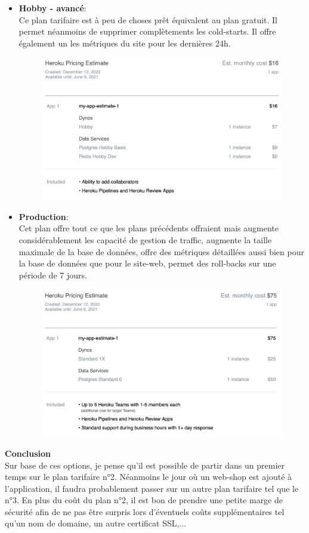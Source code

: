 \begin{itemize}
  \newpage
  \item \textbf{Hobby - avancé}: \\ Ce plan tarifaire est à peu de choses prêt équivalent au plan gratuit. Il permet néanmoins de supprimer complètements les cold-starts. Il offre également un les métriques du site pour les dernières 24h.
  \begin{figure}[H]
    \centering
    \includegraphics[width=0.75\linewidth]{img/heroku/Heroku_hobby.png}
  \end{figure}
  
  \item \textbf{Production}: \\ Cet plan offre tout ce que les plans précédents offraient mais augmente considérablement les capacité de gestion de traffic, augmente la taille maximale de la base de données, offre des métriques détaillées aussi bien pour la base de données que pour le site-web, permet des roll-backs sur une période de 7 jours.
  \begin{figure}[H]
    \centering
    \includegraphics[width=0.75\linewidth]{img/heroku/Heroku_prod.png}
  \end{figure}
\end{itemize}

\newpage
\textbf{Conclusion} \\ Sur base de ces options, je pense qu'il est possible de partir dans un premier temps sur le plan tarifaire n°2. Néanmoins le jour où un web-shop est ajouté à l'application, il faudra probablement passer sur un autre plan tarifaire tel que le n°3.
\newpara
En plus du coût du plan n°2, il est bon de prendre une petite marge de sécurité afin de ne pas être surpris lors d'éventuels coûts supplémentaires tel qu'un nom de domaine, un autre certificat SSL,...

